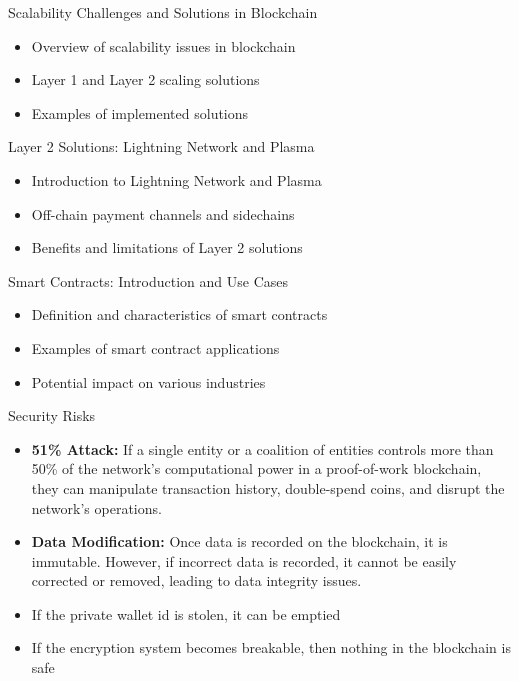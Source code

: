 \begin{withoutheadline}
\begin{frame}{Scalability Challenges and Solutions in Blockchain}
    \begin{itemize}
        \item Overview of scalability issues in blockchain
        \item Layer 1 and Layer 2 scaling solutions
        \item Examples of implemented solutions
    \end{itemize}
\end{frame}

\begin{frame}{Layer 2 Solutions: Lightning Network and Plasma}
    \begin{itemize}
        \item Introduction to Lightning Network and Plasma
        \item Off-chain payment channels and sidechains
        \item Benefits and limitations of Layer 2 solutions
    \end{itemize}
\end{frame}

\begin{frame}{Smart Contracts: Introduction and Use Cases}
    \begin{itemize}
        \item Definition and characteristics of smart contracts
        \item Examples of smart contract applications
        \item Potential impact on various industries
    \end{itemize}
\end{frame}

\begin{frame}{Security Risks}
    \begin{itemize}
        \item \textbf{51\% Attack:} If a single entity or a coalition of entities controls more than 50\% of the network's computational power in a proof-of-work blockchain, they can manipulate transaction history, double-spend coins, and disrupt the network's operations.
        \item \textbf{Data Modification:} Once data is recorded on the blockchain, it is immutable. However, if incorrect data is recorded, it cannot be easily corrected or removed, leading to data integrity issues.
        \item If the private wallet id is stolen, it can be emptied
        \item If the encryption system becomes breakable, then nothing in the blockchain is safe
    \end{itemize}
\end{frame}


\end{withoutheadline}
